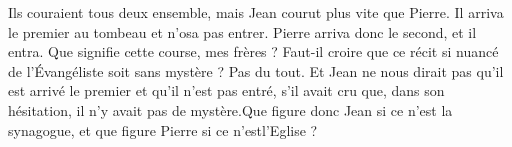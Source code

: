  Ils couraient tous deux ensemble, mais Jean courut plus vite que Pierre. Il arriva le premier au tombeau et n’osa pas entrer. Pierre arriva donc le second, et il entra. Que signifie cette course, mes frères ? Faut-il croire que ce récit si nuancé de l’Évangéliste soit sans mystère ? Pas du tout. Et Jean ne nous dirait pas qu’il est arrivé le premier et qu’il n’est pas entré, s’il avait cru que, dans son hésitation, il n’y avait pas de mystère.Que figure donc Jean si ce n’est la synagogue, et que figure Pierre si ce n’estl’Eglise ?